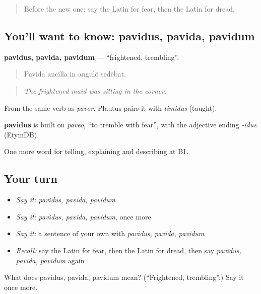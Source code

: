 \label{lesson:LA-C320-pavidus}



\begin{quote}
Before the new one: say the Latin for fear, then the Latin for dread.
\end{quote}

\subsection*{You'll want to know: pavidus, pavida, pavidum}
\textbf{pavidus, pavida, pavidum} — \textquotedblleft{}frightened, trembling\textquotedblright{}.

\begin{quote}
Pavida ancilla in angulō sedēbat.
\end{quote}

\begin{quote}
\emph{The frightened maid was sitting in the corner.}
\end{quote}

From the same verb as \emph{pavor}. Plautus pairs it with \emph{timidus} (taught).

\begin{cousinweb}
\textbf{pavidus} is built on \emph{paveō}, \textquotedblleft{}to tremble with fear\textquotedblright{}, with the adjective ending \emph{-idus} (EtymDB).
\end{cousinweb}

\begin{grammarlens}[title={What you've built}]
One more word for telling, explaining and describing at B1.
\end{grammarlens}

\subsection*{Your turn}
\begin{itemize}
\raggedright
  \item \emph{Say it:} \emph{pavidus, pavida, pavidum}
  \item \emph{Say it:} \emph{pavidus, pavida, pavidum}, once more
  \item \emph{Say it:} a sentence of your own with \emph{pavidus, pavida, pavidum}
  \item \emph{Recall:} say the Latin for fear, then the Latin for dread, then say \emph{pavidus, pavida, pavidum} again
\end{itemize}

\begin{tcolorbox}[breakable,colback=teal!4,colframe=teal!35!black,title={Before you move on}]
What does pavidus, pavida, pavidum mean? (\textquotedblleft{}Frightened, trembling\textquotedblright{}.) Say it once more.
\end{tcolorbox}
